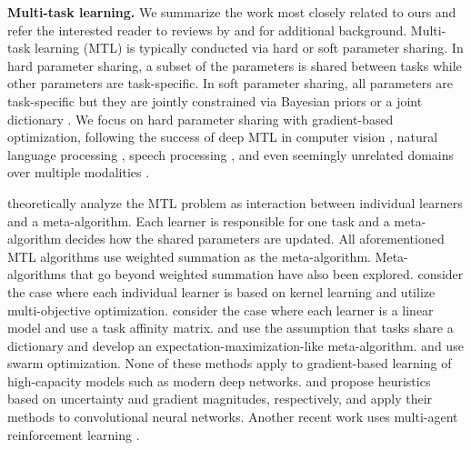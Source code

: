 
\noindent \textbf{Multi-task learning.}
We summarize the work most closely related to ours and refer the interested reader to reviews by \citet{Ruder2017} and \citet{zhou2011malsar} for additional background.
Multi-task learning (MTL) is typically conducted via hard or soft parameter sharing. In hard parameter sharing, a subset of the parameters is shared between tasks while other parameters are task-specific. In soft parameter sharing, all parameters are task-specific but they are jointly constrained via Bayesian priors \citep{Xue2007, Bakker2003} or a joint dictionary \citep{Argyriou2007, Long2015, Yang2017, Ruder2017}.  We focus on hard parameter sharing with gradient-based optimization, following the success of deep MTL in computer vision \citep{Bilen2016, Misra2016, Rudd2016, Yang2017, Kokkinos2016, Zamir2018}, natural language processing \citep{Collobert2008, Dong2015, Liu2015, Luong2015, Hashimoto2016}, speech processing \citep{Huang2013,Seltzer2013,Huang2015}, and even seemingly unrelated domains over multiple modalities \citep{Kaiser2017}.

\citet{Baxter2000} theoretically analyze the MTL problem as interaction between individual learners and a meta-algorithm. Each learner is responsible for one task and a meta-algorithm decides how the shared parameters are updated. All aforementioned MTL algorithms use weighted summation as the meta-algorithm. Meta-algorithms that go beyond weighted summation have also been explored. \citet{Cong2014} consider the case where each individual learner is based on kernel learning and utilize multi-objective optimization. \citet{Zhang2010} consider the case where each learner is a linear model and use a task affinity matrix. \citet{Zhou2011} and \citet{Bagherjeiran2005} use the assumption that tasks share a dictionary and develop an expectation-maximization-like meta-algorithm. \citet{Miranda2012} and \citet{ZhouDi2017} use swarm optimization. None of these methods apply to gradient-based learning of high-capacity models such as modern deep networks. \citet{Kendall2018} and \citet{Chen2018} propose heuristics based on uncertainty and gradient magnitudes, respectively, and apply their methods to convolutional neural networks. Another recent work uses multi-agent reinforcement learning \citep{Rosenbaum2017}.

